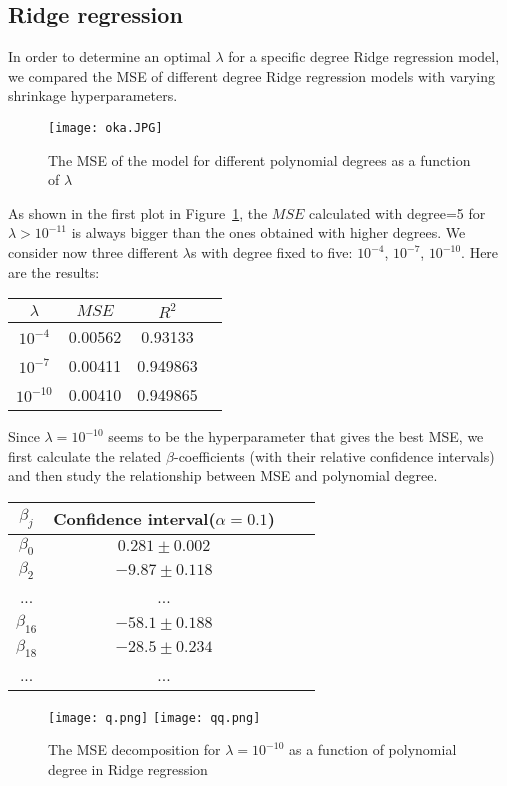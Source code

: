 \documentclass{emulateapj}
\begin{document}
\subsection{Ridge regression}
In order to determine an optimal $\lambda$ for a specific degree Ridge regression model, we compared the MSE of different degree Ridge regression models with varying shrinkage hyperparameters.
\begin{figure}[H]
\caption{The MSE of the model for different polynomial degrees as a function of $\lambda$ }
\centering
\texttt{[image: oka.JPG]}
\label{MSE_PD_LAM_RID}
\end{figure}
As shown in the first plot in Figure~\ref{MSE_PD_LAM_RID}, the $MSE$ calculated with degree=5 for $\lambda>10^{-11}$ is always bigger than the ones obtained with higher degrees. 
We consider now three different $\lambda$s with degree fixed to five: $10^{-4}$, $10^{-7}$, $10^{-10}$. Here are the results:
\begin{center}
\begin{tabular}{ |c|c|c|c| } 
\hline
$\lambda$ & $MSE$ & $R^2$ \\
\hline
$10^{-4}$ & 0.00562 & 0.93133 \\
$10^{-7}$ & 0.00411 & 0.949863\\ 
$10^{-10}$ & 0.00410 & 0.949865\\
\hline
\end{tabular}
\end{center}
Since $\lambda=10^{-10}$ seems to be the hyperparameter that gives the best MSE, we first calculate the related $\beta$-coefficients (with their relative confidence intervals) and then study the relationship between MSE and polynomial degree.
\begin{center}
\begin{tabular}{ |c|c|c|c| } 
\hline
$\beta_j$ & Confidence interval($\alpha=0.1$) \\
\hline
$\beta_0$ & $0.281\pm0.002$\\
$\beta_2$ & $-9.87\pm0.118$\\
... & ...\\
$\beta_{16}$ & $-58.1\pm0.188$\\
$\beta_{18}$ & $-28.5\pm0.234$\\
... & ...\\
\hline
\end{tabular}
\end{center}
\begin{figure}[H]
\centering
\caption{The MSE decomposition for $\lambda=10^{-10}$ as a function of polynomial degree in Ridge regression}
\texttt{[image: q.png]}
\texttt{[image: qq.png]}
\label{decom_rid}
\end{figure}
\end{document}
